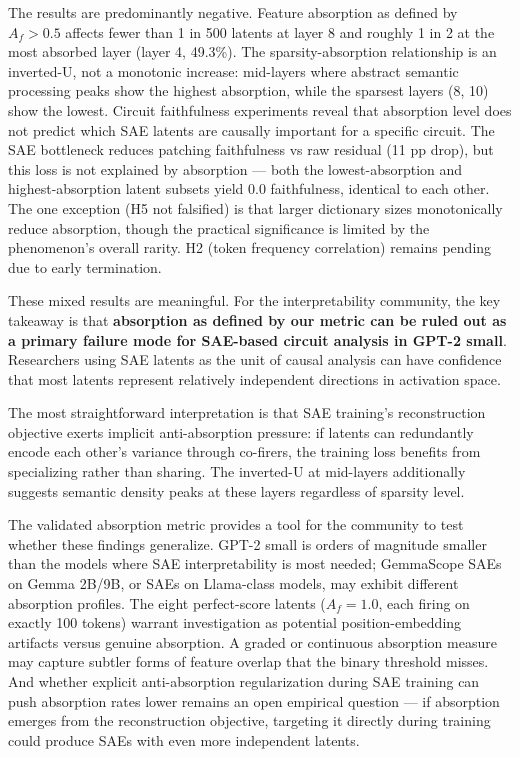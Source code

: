 \documentclass{article}
\begin{document}
The results are predominantly negative. Feature absorption as defined by $A_f > 0.5$ affects fewer than 1 in 500 latents at layer 8 and roughly 1 in 2 at the most absorbed layer (layer 4, 49.3\%). The sparsity-absorption relationship is an inverted-U, not a monotonic increase: mid-layers where abstract semantic processing peaks show the highest absorption, while the sparsest layers (8, 10) show the lowest. Circuit faithfulness experiments reveal that absorption level does not predict which SAE latents are causally important for a specific circuit. The SAE bottleneck reduces patching faithfulness vs raw residual (11 pp drop), but this loss is not explained by absorption --- both the lowest-absorption and highest-absorption latent subsets yield 0.0 faithfulness, identical to each other. The one exception (H5 not falsified) is that larger dictionary sizes monotonically reduce absorption, though the practical significance is limited by the phenomenon's overall rarity. H2 (token frequency correlation) remains pending due to early termination.

These mixed results are meaningful. For the interpretability community, the key takeaway is that \textbf{absorption as defined by our metric can be ruled out as a primary failure mode for SAE-based circuit analysis in GPT-2 small}. Researchers using SAE latents as the unit of causal analysis can have confidence that most latents represent relatively independent directions in activation space.

The most straightforward interpretation is that SAE training's reconstruction objective exerts implicit anti-absorption pressure: if latents can redundantly encode each other's variance through co-firers, the training loss benefits from specializing rather than sharing. The inverted-U at mid-layers additionally suggests semantic density peaks at these layers regardless of sparsity level.

The validated absorption metric provides a tool for the community to test whether these findings generalize. GPT-2 small is orders of magnitude smaller than the models where SAE interpretability is most needed; GemmaScope SAEs on Gemma 2B/9B, or SAEs on Llama-class models, may exhibit different absorption profiles. The eight perfect-score latents ($A_f = 1.0$, each firing on exactly 100 tokens) warrant investigation as potential position-embedding artifacts versus genuine absorption. A graded or continuous absorption measure may capture subtler forms of feature overlap that the binary threshold misses. And whether explicit anti-absorption regularization during SAE training can push absorption rates lower remains an open empirical question --- if absorption emerges from the reconstruction objective, targeting it directly during training could produce SAEs with even more independent latents.
\end{document}
